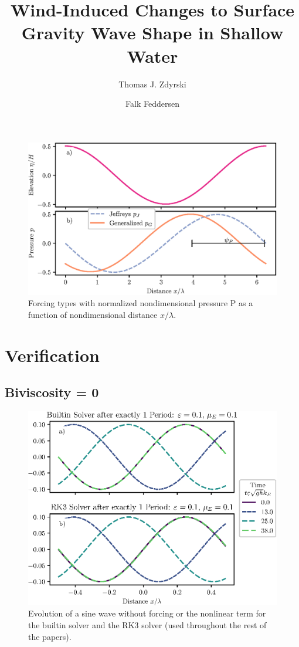 \documentclass{jfm}
\title{Wind-Induced Changes to Surface Gravity Wave Shape in Shallow Water}
\author{Thomas J. Zdyrski \and Falk Feddersen}
\let\Oldsection\section
\renewcommand{\section}{\FloatBarrier\Oldsection}
\let\Oldsubsection\subsection
\renewcommand{\subsection}{\FloatBarrier\Oldsubsection}
\begin{document}
\begin{figure}
  \centering
  \includegraphics{Forcing-Types.eps}
  \caption{
    Forcing types with normalized nondimensional pressure P as a
    function of nondimensional distance $x/\lambda$.
  }
\end{figure}

\section{Verification}
\subsection{Biviscosity = \num{0}}
\begin{figure}
  \centering
  \includegraphics{TrigVerf-noH.eps}
  \caption{
    Evolution of a sine wave without forcing or the nonlinear term for
    the builtin solver and the RK3 solver (used throughout the rest of
    the papers).
  }
\end{figure}
\end{document}
